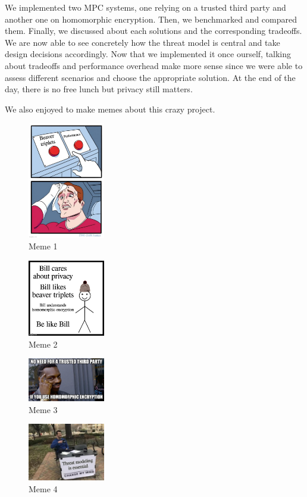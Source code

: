 \documentclass[10pt,conference]{IEEEtran}
\begin{document}
We implemented two MPC systems, one relying on a trusted third party and another one on homomorphic encryption. Then, we benchmarked and compared them. Finally, we discussed about each solutions and the corresponding tradeoffs. We are now able to see concretely how the threat model is central and take design decisions accordingly. Now that we implemented it once ourself, talking about tradeoffs and performance overhead make more sense since we were able to assess different scenarios and choose the appropriate solution. At the end of the day, there is no free lunch but privacy still matters.

\newpage
We also enjoyed to make memes about this crazy project.
\begin{figure}[h]
  \caption{Meme 1}
  \includegraphics[width=0.3\textwidth]{pets_meme_1.jpg}
\end{figure}
\begin{figure}[h]
  \caption{Meme 2}
  \includegraphics[width=0.3\textwidth]{pets_meme_2.jpg}
\end{figure}
\begin{figure}[h]
  \caption{Meme 3}
  \includegraphics[width=0.3\textwidth]{pets_meme_3.jpg}
\end{figure}
\begin{figure}[h]
  \caption{Meme 4}
  \includegraphics[width=0.3\textwidth]{pets_meme_4.jpg}
\end{figure}
\end{document}
